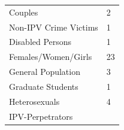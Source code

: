 \documentclass[]{tufte-handout}
\begin{document}
\begin{longtable}[]{@{}ll@{}}
\begin{minipage}[t]{0.59\columnwidth}
Couples\strut
\end{minipage} & \begin{minipage}[t]{0.21\columnwidth}\raggedright\strut
2\strut
\end{minipage}\tabularnewline
\begin{minipage}[t]{0.59\columnwidth}\raggedright\strut
Non-IPV Crime Victims\strut
\end{minipage} & \begin{minipage}[t]{0.21\columnwidth}\raggedright\strut
1\strut
\end{minipage}\tabularnewline
\begin{minipage}[t]{0.59\columnwidth}\raggedright\strut
Disabled Persons\strut
\end{minipage} & \begin{minipage}[t]{0.21\columnwidth}\raggedright\strut
1\strut
\end{minipage}\tabularnewline
\begin{minipage}[t]{0.59\columnwidth}\raggedright\strut
Females/Women/Girls\strut
\end{minipage} & \begin{minipage}[t]{0.21\columnwidth}\raggedright\strut
23\strut
\end{minipage}\tabularnewline
\begin{minipage}[t]{0.59\columnwidth}\raggedright\strut
General Population\strut
\end{minipage} & \begin{minipage}[t]{0.21\columnwidth}\raggedright\strut
3\strut
\end{minipage}\tabularnewline
\begin{minipage}[t]{0.59\columnwidth}\raggedright\strut
Graduate Students\strut
\end{minipage} & \begin{minipage}[t]{0.21\columnwidth}\raggedright\strut
1\strut
\end{minipage}\tabularnewline
\begin{minipage}[t]{0.59\columnwidth}\raggedright\strut
Heterosexuals\strut
\end{minipage} & \begin{minipage}[t]{0.21\columnwidth}\raggedright\strut
4\strut
\end{minipage}\tabularnewline
\begin{minipage}[t]{0.59\columnwidth}\raggedright\strut
IPV-Perpetrators\strut
\end{minipage} & \begin{minipage}[t]{0.21\columnwidth}\raggedright\strut

\end{minipage}
\end{longtable}
\end{document}

